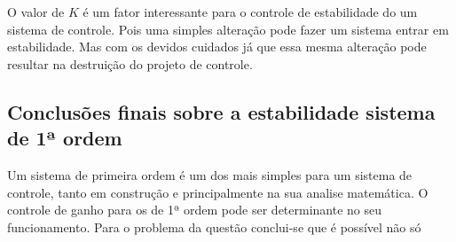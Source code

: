 \documentclass[paper=a4, fontsize=11pt]{article}
\begin{document}
O valor de $K$ é um fator interessante para o controle de estabilidade do um 
sistema de controle. Pois uma simples alteração pode fazer um sistema 
entrar em estabilidade. Mas com os devidos cuidados já que essa mesma alteração
pode resultar na destruição do projeto de controle.

\subsection{Conclusões finais sobre a estabilidade sistema de 1ª ordem}

Um sistema de primeira ordem é um dos mais simples para um sistema de controle, 
tanto em construção e principalmente na sua analise matemática. O controle
de ganho para os de 1ª ordem pode ser determinante no seu funcionamento. 
Para o problema da questão conclui-se que é possível não só
\end{document}
